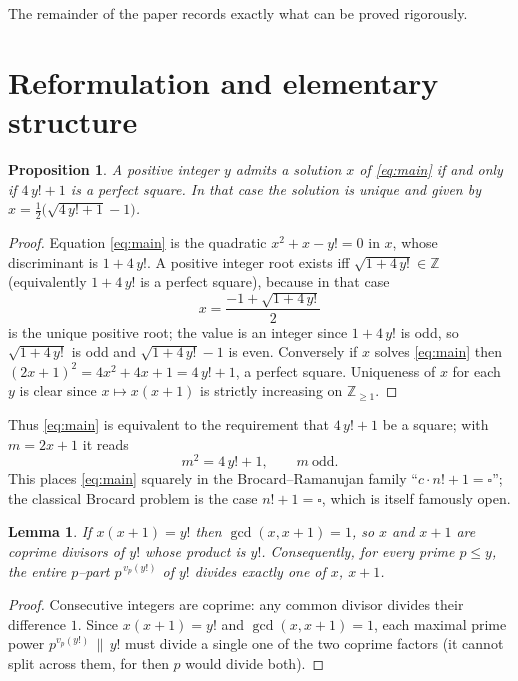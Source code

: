 \documentclass{amsart}
\theoremstyle{plain}
\newtheorem{proposition}{Proposition}
\newtheorem{lemma}{Lemma}
\theoremstyle{remark}
\begin{document}
The remainder of the paper records exactly what can be proved rigorously.

\section{Reformulation and elementary structure}

\begin{proposition}\label{prop:square}
A positive integer $y$ admits a solution $x$ of \eqref{eq:main} if and only
if $4\,y!+1$ is a perfect square.  In that case the solution is unique and
given by $x=\tfrac{1}{2}\bigl(\sqrt{4\,y!+1}-1\bigr)$.
\end{proposition}

\begin{proof}
Equation \eqref{eq:main} is the quadratic $x^2+x-y!=0$ in $x$, whose
discriminant is $1+4\,y!$.  A positive integer root exists iff
$\sqrt{1+4\,y!}\in\mathbb{Z}$ (equivalently $1+4\,y!$ is a perfect square),
because in that case
\[
   x=\frac{-1+\sqrt{1+4\,y!}}{2}
\]
is the unique positive root; the value is an integer since $1+4\,y!$ is
odd, so $\sqrt{1+4\,y!}$ is odd and $\sqrt{1+4\,y!}-1$ is even.  Conversely
if $x$ solves \eqref{eq:main} then $(2x+1)^2=4x^2+4x+1=4\,y!+1$, a perfect
square.  Uniqueness of $x$ for each $y$ is clear since $x\mapsto x(x+1)$ is
strictly increasing on $\mathbb{Z}_{\ge 1}$.
\end{proof}

Thus \eqref{eq:main} is equivalent to the requirement that $4\,y!+1$ be a
square; with $m=2x+1$ it reads
\begin{equation}\label{eq:m}
   m^2=4\,y!+1,\qquad m\ \text{odd}.
\end{equation}
This places \eqref{eq:main} squarely in the Brocard--Ramanujan family
``$c\cdot n!+1=\square$''; the classical Brocard problem is the case
$n!+1=\square$, which is itself famously open.

\begin{lemma}\label{lem:coprime}
If $x(x+1)=y!$ then $\gcd(x,x+1)=1$, so $x$ and $x+1$ are coprime divisors
of $y!$ whose product is $y!$.  Consequently, for every prime $p\le y$, the
entire $p$--part $p^{\,v_p(y!)}$ of $y!$ divides exactly one of $x$, $x+1$.
\end{lemma}

\begin{proof}
Consecutive integers are coprime: any common divisor divides their
difference $1$.  Since $x(x+1)=y!$ and $\gcd(x,x+1)=1$, each maximal prime
power $p^{v_p(y!)}\,\|\,y!$ must divide a single one of the two coprime
factors (it cannot split across them, for then $p$ would divide both).
\end{proof}
\end{document}
